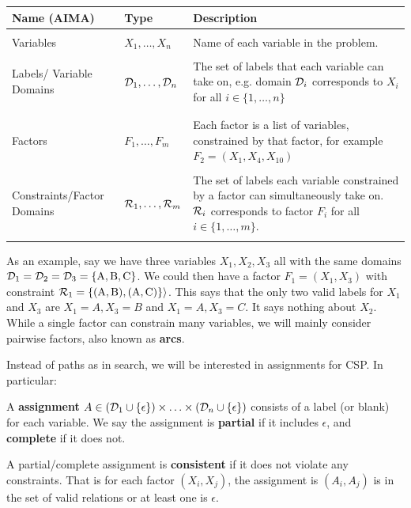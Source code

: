 \documentclass[11pt]{article}
\begin{document}
 \air
\begin{center}
\begin{tabularx}{\linewidth}{llX}
  \toprule
  Name (AIMA) & Type & Description \\
  \midrule
\\
 Variables & $X_1, \ldots, X_n$ &  Name of each variable in the problem.\\\\
 Labels/ Variable Domains & $\mathcal{D}_1, \ldots, \mathcal{D}_n$&   The set of labels that each variable can take on, e.g. domain $\mathcal{D}_i$  corresponds to $X_i$ for all $i \in \{1, \ldots, n\} $\\\\
 \midrule\\
 Factors & $F_1, \ldots,F_m$ & Each factor is a list of variables, constrained by that factor, for example $F_2 = ( X_1, X_4, X_{10})$  \\\\
 Constraints/Factor Domains &  $\mathcal{R}_1, \ldots, \mathcal{R}_m$ & The set of labels each variable constrained by a factor can simultaneously take on. $\mathcal{R}_i$ corresponds to factor $F_i$ for all $i \in \{1, \ldots, m\} $.     \\\\
 \bottomrule
\end{tabularx}
\end{center}


As an example, say we have three variables $X_1, X_2, X_3$ all with
the same domains $\mathcal{D}_1 = \mathcal{D}_2 = \mathcal{D}_3 = \{\mathrm{A, B, C}\}$. We
could then have a factor $F_1 = (X_1, X_3)$ with constraint $\mathcal{R}_1 =
\{(\mathrm{A, B}), \mathrm{(A, C})\} \rangle $. This says that the
only two valid labels for $X_1$ and $X_3$ are $X_1 = A, X_3 = B$ and
$X_1 = A, X_3=C$. It says nothing about $X_2$.  While a single factor
can constrain many variables, we will mainly consider
pairwise factors, also known as \textbf{arcs}.

Instead of paths as in search, we will be interested in assignments for CSP. In particular:  

\begin{defn}
A \textbf{assignment} $A \in (\mathcal{D}_1 \cup \{\epsilon\}) \times \ldots \times (\mathcal{D}_n \cup \{\epsilon\})$ consists of a label (or blank) for each variable. We say the assignment is \textbf{partial} if it includes $\epsilon$, and \textbf{complete} if it does not. 
\end{defn}


\begin{defn}
  A partial/complete assignment is \textbf{consistent} if it
  does not violate any constraints. That is for each factor $(X_i, X_j)$,
  the assignment is $(A_i, A_j)$ is in the set of valid relations or
  at least one is $\epsilon$.
\end{defn}
\end{document}
